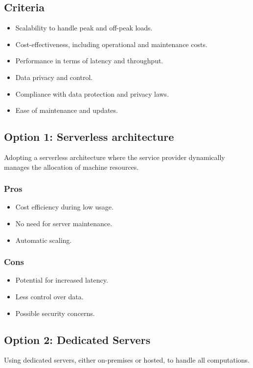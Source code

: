 \subsection*{Criteria}
\begin{itemize}
    \item Scalability to handle peak and off-peak loads.
    \item Cost-effectiveness, including operational and maintenance costs.
    \item Performance in terms of latency and throughput.
    \item Data privacy and control.
    \item Compliance with data protection and privacy laws.
    \item Ease of maintenance and updates.
\end{itemize}

\subsection*{Option 1: Serverless architecture}
Adopting a serverless architecture where the service provider dynamically manages the allocation of machine resources.
\subsubsection*{Pros}
\begin{itemize}
    \item Cost efficiency during low usage.
    \item No need for server maintenance.
    \item Automatic scaling.
\end{itemize}
\subsubsection*{Cons}
\begin{itemize}
    \item Potential for increased latency.
    \item Less control over data.
    \item Possible security concerns.
\end{itemize}

\subsection*{Option 2: Dedicated Servers}
Using dedicated servers, either on-premises or hosted, to handle all computations.
